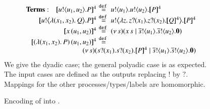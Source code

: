 \begin{figure}[t]
\[\begin{array}{rcl}
{\bf Terms:} \quad		\map{\bout{u}{u_1, u_2} P}^{4}
		&\!\!\!\!\defeq\!\!\!\!&
		\bout{u}{u_1} \bout{u}{u_2} \map{P}^{4}
		\\
		\map{\bbout{u}{\abs{(x_1,  x_2)} Q} P}^{4}
		&\!\!\!\!\defeq\!\!\!\!&
		\bbout{u}{\abs{z}\binp{z}{x_1} \binp{z}{x_2} \map{Q}^{4}} \map{P}^{4}
		\\ 
		\map{\appl{x}{(u_1,   u_2)}}^{4}
		&\!\!\!\!\defeq\!\!\!\!&
		\newsp{s}{\appl{x}{s} \Par \bout{\dual{s}}{u_1}   \bout{\dual{s}}{u_2} \inact}
		\\
		\map{\appl{(\abs{(x_1,x_2)}{P})}{(u_1,   u_2)}}^{4}
		&\!\!\!\!\defeq\!\!\!\!& \\
		\multicolumn{3}{l}{
		\qquad \qquad \qquad \qquad \newsp{s}{\binp{s}{x_1}  \binp{s}{x_2} \pmap{P}{4} \Par \bout{\dual{s}}{u_1}  \bout{\dual{s}}{u_2} \inact} 
		}
        \\ 
	\end{array}
\]
We give the dyadic case;
the general polyadic case is as expected.
The input cases are defined as the outputs replacing $!$ by $?$. 
Mappings for the other processes/types/labels are 
homomorphic.
\smallskip
\caption{\label{f:enc:poltomon}
Encoding of \PHOp into \HOp. 
}
\Hlinefig 
\end{figure}

